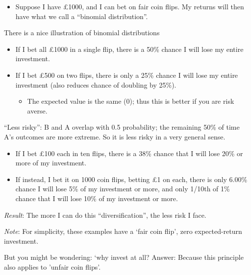 \documentclass[]{article}
\providecommand{\tightlist}{%
  \setlength{\itemsep}{0pt}\setlength{\parskip}{0pt}}
\begin{document}
\begin{itemize}
\tightlist
\item
  Suppose I have \pounds 1000, and I can bet on fair coin flips. My
  returns will then have what we call a ``binomial distribution''.
\end{itemize}

There is a nice illustration of binomial distributions

\begin{itemize}
\tightlist
\item
  If I bet all \pounds 1000 in a single flip, there is a 50\% chance I
  will lose my entire investment.
\item
  If I bet \pounds 500 on two flips, there is only a 25\% chance I will
  lose my entire investment (also reduces chance of doubling by 25\%).

  \begin{itemize}
  \tightlist
  \item
    The expected value is the same (0); thus this is better if you are
    risk averse.
  \end{itemize}
\end{itemize}

``Less risky'': B and A overlap with 0.5 probability; the remaining 50\%
of time A's outcomes are more extreme. So it is less risky in a very
general sense.

\begin{itemize}
\tightlist
\item
  If I bet \pounds 100 each in ten flips, there is a 38\% chance that I
  will lose 20\% or more of my investment.
\item
  If instead, I bet it on 1000 coin flips, betting \pounds 1 on each,
  there is only 6.00\% chance I will lose 5\% of my investment or more,
  and only 1/10th of 1\% chance that I will lose 10\% of my investment
  or more.
\end{itemize}

\bigskip

\emph{Result}: The more I can do this ``diversification'', the less risk
I face.

\bigskip

\emph{Note}: For simplicity, these examples have a `fair coin flip',
zero expected-return investment.

\bigskip

But you might be wondering: `why invest at all? Answer: Because this
principle also applies to 'unfair coin flips'.
\end{document}
